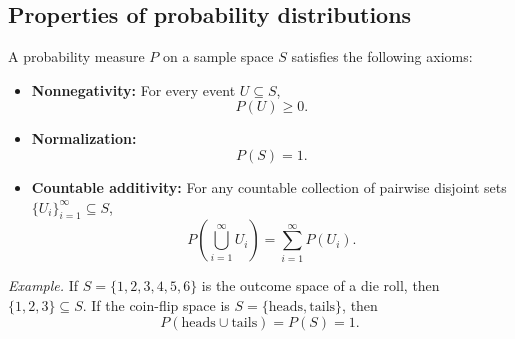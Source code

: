 \subsection{Properties of probability distributions}



A probability measure $P$ on a sample space $S$ satisfies the following axioms:
\begin{itemize}
\item \textbf{Nonnegativity:} For every event $U \subseteq S$, 
\[ P(U) \ge 0. \]
\item \textbf{Normalization:} 
\[ P(S) = 1. \]
\item \textbf{Countable additivity:} For any countable collection of pairwise disjoint sets $\{U_i\}_{i=1}^\infty \subseteq S$, 
\[ P\!\left(\bigcup_{i=1}^\infty U_i\right) = \sum_{i=1}^\infty P(U_i). \]
\end{itemize}

\emph{Example.} If $S=\{1,2,3,4,5,6\}$ is the outcome space of a die roll, then $\{1,2,3\}\subseteq S$.  
If the coin-flip space is $S=\{\text{heads},\text{tails}\}$, then
\[ P(\text{heads} \cup \text{tails}) = P(S) = 1. \]




